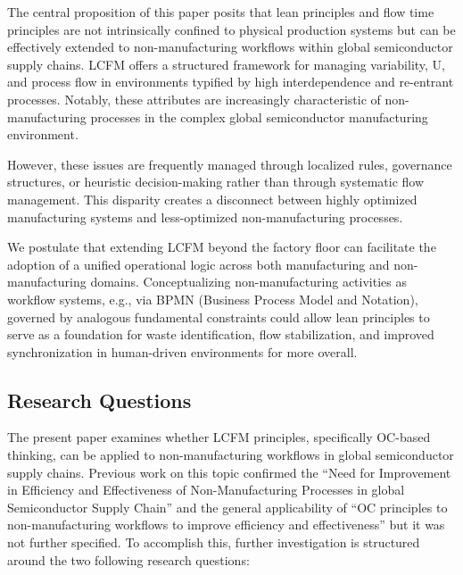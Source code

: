\documentclass[preprint,12pt,authoryear]{elsarticle}
\begin{document}
The central proposition of this paper posits that lean principles \citep{hopp2001} and flow time principles \citep{macchi2008comparing} are not intrinsically confined to physical production systems but can be effectively extended to non-manufacturing workflows within global semiconductor supply chains. LCFM offers a structured framework for managing variability, U, and process flow in environments typified by high interdependence and re-entrant processes. Notably, these attributes are increasingly characteristic of non-manufacturing processes in the complex global semiconductor manufacturing environment. 

However, these issues are frequently managed through localized rules, governance structures, or heuristic decision-making \citep{Loesch2019, Kleinmuntz1987} rather than through systematic flow management. This disparity creates a disconnect between highly optimized manufacturing systems and less-optimized non-manufacturing processes.

We postulate that extending LCFM beyond the factory floor can facilitate the adoption of a unified operational logic across both manufacturing and non-manufacturing domains. Conceptualizing non-manufacturing activities as workflow systems, e.g., via BPMN (Business Process Model and Notation), governed by analogous fundamental constraints could allow lean principles to serve as a foundation for waste identification, flow stabilization, and improved synchronization in human-driven environments for more overall.

 

\subsection{Research Questions}\label{sec:Research Questions}

The present paper examines whether LCFM principles, specifically OC-based thinking, can be applied to non-manufacturing workflows in global semiconductor supply chains. Previous work on this topic \citep{LauterEhmReiner2025} confirmed the ``Need for Improvement in Efficiency and Effectiveness of Non-Manufacturing Processes in global Semiconductor Supply Chain'' \citep{LauterEhmReiner2025} and the general applicability of ``OC principles to non-manufacturing workflows to improve efficiency and effectiveness'' \citep{LauterEhmReiner2025} but it was not further specified. To accomplish this, further investigation is structured around the two following research questions:
\end{document}
